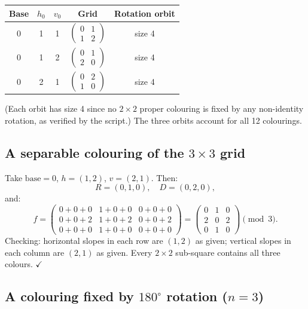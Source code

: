 \documentclass{article}
\begin{document}
\begin{center}
\begin{tabular}{ccccc}
  \toprule
  Base & $h_0$ & $v_0$
       & Grid
       & Rotation orbit \\
  \midrule
  0 & 1 & 1 &
    $\begin{pmatrix}0&1\\1&2\end{pmatrix}$ & size 4 \\
  0 & 1 & 2 &
    $\begin{pmatrix}0&1\\2&0\end{pmatrix}$ & size 4 \\
  0 & 2 & 1 &
    $\begin{pmatrix}0&2\\1&0\end{pmatrix}$ & size 4 \\
  \bottomrule
\end{tabular}
\end{center}

(Each orbit has size 4 since no $2\times 2$ proper colouring
is fixed by any non-identity rotation, as verified by the
script.)  The three orbits account for all 12 colourings.

\subsection{A separable colouring of the $3\times 3$ grid}

Take $\mathrm{base}=0$, $h=(1,2)$, $v=(2,1)$.  Then:
\[
  R = (0,1,0),\quad D = (0,2,0),
\]
and:
\[
  f = \begin{pmatrix}
    0+0+0 & 1+0+0 & 0+0+0 \\
    0+0+2 & 1+0+2 & 0+0+2 \\
    0+0+0 & 1+0+0 & 0+0+0
  \end{pmatrix}
  =\begin{pmatrix}
    0 & 1 & 0 \\
    2 & 0 & 2 \\
    0 & 1 & 0
  \end{pmatrix}
  \pmod 3.
\]
Checking: horizontal slopes in each row are $(1,2)$
as given; vertical slopes in each column are $(2,1)$
as given.  Every $2\times 2$ sub-square contains all three
colours. $\checkmark$

\subsection{A colouring fixed by $180^\circ$ rotation
  ($n=3$)}
\end{document}

